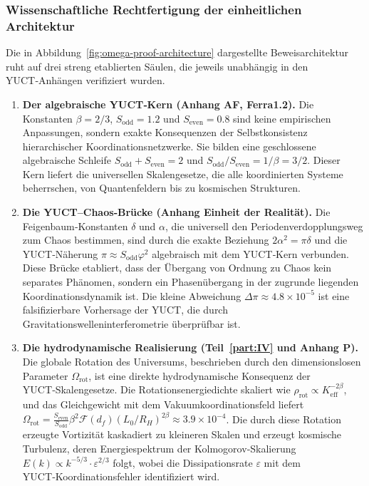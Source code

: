\documentclass[11pt,a4paper]{article}
\begin{document}
	\subsubsection*{Wissenschaftliche Rechtfertigung der einheitlichen Architektur}
	
	Die in Abbildung~\ref{fig:omega-proof-architecture} dargestellte Beweisarchitektur ruht auf drei streng etablierten Säulen, die jeweils unabhängig in den YUCT‑Anhängen verifiziert wurden.
	
	\begin{enumerate}
		\item \textbf{Der algebraische YUCT‑Kern (Anhang AF, Ferra1.2).} Die Konstanten \(\beta = 2/3\), \(S_{\mathrm{odd}}=1.2\) und \(S_{\mathrm{even}}=0.8\) sind keine empirischen Anpassungen, sondern exakte Konsequenzen der Selbstkonsistenz hierarchischer Koordinationsnetzwerke. Sie bilden eine geschlossene algebraische Schleife \(S_{\mathrm{odd}}+S_{\mathrm{even}}=2\) und \(S_{\mathrm{odd}}/S_{\mathrm{even}} = 1/\beta = 3/2\). Dieser Kern liefert die universellen Skalengesetze, die alle koordinierten Systeme beherrschen, von Quantenfeldern bis zu kosmischen Strukturen.
		
		\item \textbf{Die YUCT–Chaos‑Brücke (Anhang Einheit der Realität).} Die Feigenbaum‑Konstanten \(\delta\) und \(\alpha\), die universell den Periodenverdopplungsweg zum Chaos bestimmen, sind durch die exakte Beziehung \(2\alpha^2 = \pi\delta\) und die YUCT‑Näherung \(\pi \approx S_{\mathrm{odd}}\varphi^2\) algebraisch mit dem YUCT‑Kern verbunden. Diese Brücke etabliert, dass der Übergang von Ordnung zu Chaos kein separates Phänomen, sondern ein Phasenübergang in der zugrunde liegenden Koordinationsdynamik ist. Die kleine Abweichung \(\Delta\pi \approx 4.8\times10^{-5}\) ist eine falsifizierbare Vorhersage der YUCT, die durch Gravitationswelleninterferometrie überprüfbar ist.
		
		\item \textbf{Die hydrodynamische Realisierung (Teil~\ref{part:IV} und Anhang P).} Die globale Rotation des Universums, beschrieben durch den dimensionslosen Parameter \(\Omega_{\mathrm{rot}}\), ist eine direkte hydrodynamische Konsequenz der YUCT‑Skalengesetze. Die Rotationsenergiedichte skaliert wie \(\rho_{\mathrm{rot}} \propto K_{\mathrm{eff}}^{-2\beta}\), und das Gleichgewicht mit dem Vakuumkoordinationsfeld liefert \(\Omega_{\mathrm{rot}} = \frac{S_{\mathrm{even}}}{S_{\mathrm{odd}}} \beta^2 \mathcal{F}(d_f) (L_0/R_H)^{2\beta} \approx 3.9\times10^{-4}\). Die durch diese Rotation erzeugte Vortizität kaskadiert zu kleineren Skalen und erzeugt kosmische Turbulenz, deren Energiespektrum der Kolmogorov‑Skalierung \(E(k) \propto k^{-5/3} \cdot \varepsilon^{2/3}\) folgt, wobei die Dissipationsrate \(\varepsilon\) mit dem YUCT‑Koordinationsfehler identifiziert wird.
	\end{enumerate}
	
\end{document}
